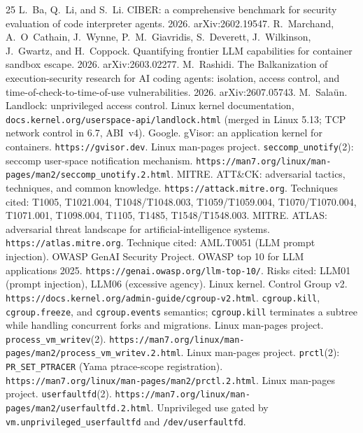 \documentclass[11pt]{article}
\begin{document}
\begin{thebibliography}{25}
 L.~Ba, Q.~Li, and S.~Li. CIBER: a comprehensive benchmark for security evaluation of code interpreter agents. 2026. arXiv:2602.19547.
 R.~Marchand, A.~O~Cathain, J.~Wynne, P.~M.~Giavridis, S.~Deverett, J.~Wilkinson, J.~Gwartz, and H.~Coppock. Quantifying frontier LLM capabilities for container sandbox escape. 2026. arXiv:2603.02277.
 M.~Rashidi. The Balkanization of execution-security research for AI coding agents: isolation, access control, and time-of-check-to-time-of-use vulnerabilities. 2026. arXiv:2607.05743.
 M.~Salaün. Landlock: unprivileged access control. Linux kernel documentation, \texttt{docs.kernel.org/userspace-api/landlock.html} (merged in Linux 5.13; TCP network control in 6.7, ABI~v4).
 Google. gVisor: an application kernel for containers. \texttt{https://gvisor.dev}.
 Linux man-pages project. \texttt{seccomp\_unotify}(2): seccomp user-space notification mechanism. \texttt{https://man7.org/linux/man-pages/man2/seccomp\_unotify.2.html}.
 MITRE. ATT\&CK: adversarial tactics, techniques, and common knowledge. \texttt{https://attack.mitre.org}. Techniques cited: T1005, T1021.004, T1048/T1048.003, T1059/T1059.004, T1070/T1070.004, T1071.001, T1098.004, T1105, T1485, T1548/T1548.003.
 MITRE. ATLAS: adversarial threat landscape for artificial-intelligence systems. \texttt{https://atlas.mitre.org}. Technique cited: AML.T0051 (LLM prompt injection).
 OWASP GenAI Security Project. OWASP top 10 for LLM applications 2025. \texttt{https://genai.owasp.org/llm-top-10/}. Risks cited: LLM01 (prompt injection), LLM06 (excessive agency).
 Linux kernel. Control Group v2. \texttt{https://docs.kernel.org/admin-guide/cgroup-v2.html}. \texttt{cgroup.kill}, \texttt{cgroup.freeze}, and \texttt{cgroup.events} semantics; \texttt{cgroup.kill} terminates a subtree while handling concurrent forks and migrations.
 Linux man-pages project. \texttt{process\_vm\_writev}(2). \texttt{https://man7.org/linux/man-pages/man2/process\_vm\_writev.2.html}.
 Linux man-pages project. \texttt{prctl}(2): \texttt{PR\_SET\_PTRACER} (Yama ptrace-scope registration). \texttt{https://man7.org/linux/man-pages/man2/prctl.2.html}.
 Linux man-pages project. \texttt{userfaultfd}(2). \texttt{https://man7.org/linux/man-pages/man2/userfaultfd.2.html}. Unprivileged use gated by \texttt{vm.unprivileged\_userfaultfd} and \texttt{/dev/userfaultfd}.
\end{thebibliography}
\end{document}
